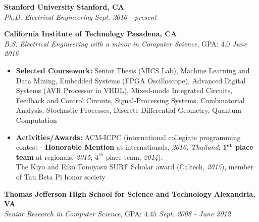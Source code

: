 \documentclass{article}
\newenvironment{changemargin}[2]{%
  \begin{list}{}{%
    \setlength{\topsep}{0pt}%
    \setlength{\leftmargin}{#1}%
    \setlength{\rightmargin}{#2}%
    \setlength{\listparindent}{\parindent}%
    \setlength{\itemindent}{\parindent}%
    \setlength{\parsep}{\parskip}%
  }%
  \item[]}{\end{list}
}
\newenvironment{body} {
	\vspace*{-16pt}
	\begin{changemargin}{-0.25in}{-0.5in}
  }	
	{\end{changemargin}
}
\begin{document}
\begin{body}
	\vspace{14pt}
	\textbf{Stanford University} \hfill \textbf{Stanford, CA} \\
	\emph{Ph.D. Electrical Engineering} \hfill \emph{Sept. 2016 - present} \\

	\smallskip

	\textbf{California Institute of Technology} \hfill \textbf{Pasadena, CA} \\
	\emph{B.S. Electrical Engineering with a minor in Computer Science}, GPA: $4.0$ \hfill \emph{June 2016} \\
	\begin{itemize}
	\item \textbf{Selected Coursework:} Senior Thesis (MICS Lab), Machine Learning and Data Mining, Embedded Systems (FPGA Oscilloscope), Advanced Digital Systems (AVR Processor in VHDL), Mixed-mode Integrated Circuits, Feedback and Control Circuits, Signal-Processing Systems, Combinatorial Analysis, Stochastic Processes, Discrete Differential Geometry, Quantum Computation
	\item \textbf{Activities/Awards:} ACM-ICPC (international collegiate programming contest - \textbf{Honorable Mention} at internationals, \textit{2016, Thailand}; $\boldsymbol{1}^\text{\textbf{st}}$ \textbf{place team} at regionals, \textit{2015}; $4^\text{th}$ place team, \textit{2014}),\\The Kiyo and Eiko Tomiyasu SURF Scholar award (Caltech, \textit{2015}), member of Tau Beta Pi honor society
	\end{itemize}

	\smallskip

	\textbf{Thomas Jefferson High School for Science and Technology} \hfill \textbf{Alexandria, VA} \\
	\emph{Senior Research in Computer Science}, GPA: $4.45$ \hfill \emph{Sept. 2008 - June 2012} \\
\end{body}
\end{document}
